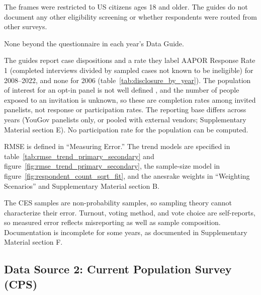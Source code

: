 \documentclass[12pt]{article}
\begin{document}
\begin{description}[style=unboxed, leftmargin=0pt, font=\normalfont\bfseries]
\item[Screening Criteria and Process:] The frames were restricted to US citizens ages 18 and older. The guides do not document any other eligibility screening or whether respondents were routed from other surveys.

\item[Study Stimuli:] None beyond the questionnaire in each year's Data Guide.

\item[Dispositions or Response or Participation Rates:] The guides report case dispositions and a rate they label AAPOR Response Rate 1 (completed interviews divided by sampled cases not known to be ineligible) for 2008--2022, and none for 2006 (table~\ref{tab:disclosure_by_year}). The population of interest for an opt-in panel is not well defined \parencite[78]{aapor2023}, and the number of people exposed to an invitation is unknown, so these are completion rates among invited panelists, not response or participation rates. The reporting base differs across years (YouGov panelists only, or pooled with external vendors; Supplementary Material section E). No participation rate for the population can be computed.

\item[Measurement and Model Specification:] RMSE is defined in ``Measuring Error.'' The trend models are specified in table~\ref{tab:rmse_trend_primary_secondary} and figure~\ref{fig:rmse_trend_primary_secondary}, the sample-size model in figure~\ref{fig:respondent_count_sqrt_fit}, and the anesrake weights in ``Weighting Scenarios'' and Supplementary Material section B.

\item[Limitations:] The CES samples are non-probability samples, so sampling theory cannot characterize their error. Turnout, voting method, and vote choice are self-reports, so measured error reflects misreporting as well as sample composition. Documentation is incomplete for some years, as documented in Supplementary Material section F.
\end{description}

\subsection*{Data Source 2: Current Population Survey (CPS)}
\end{document}
